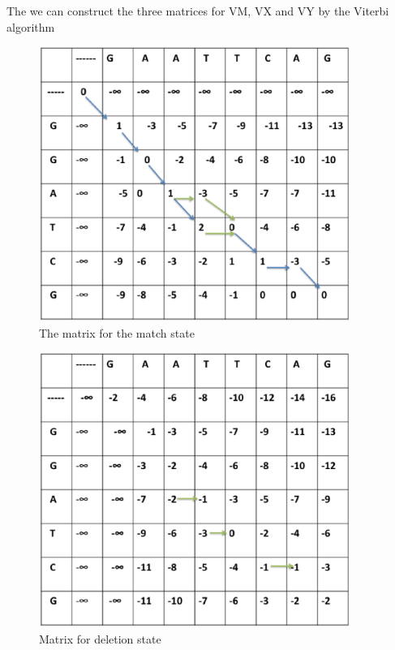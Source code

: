 \documentclass[english, a4paper,11pt]{article}
\begin{document}
The we can construct the three matrices for VM, VX and VY by the Viterbi
algorithm

\begin{figure}
\begin{centering}
\includegraphics[width=4in]{Slide1}\caption{The matrix for the match state}
\par\end{centering}
\end{figure}

\begin{figure}
\begin{centering}
\includegraphics[width=4in]{Slide2}
\par\end{centering}
\caption{Matrix for deletion state}
\end{figure}
\end{document}
